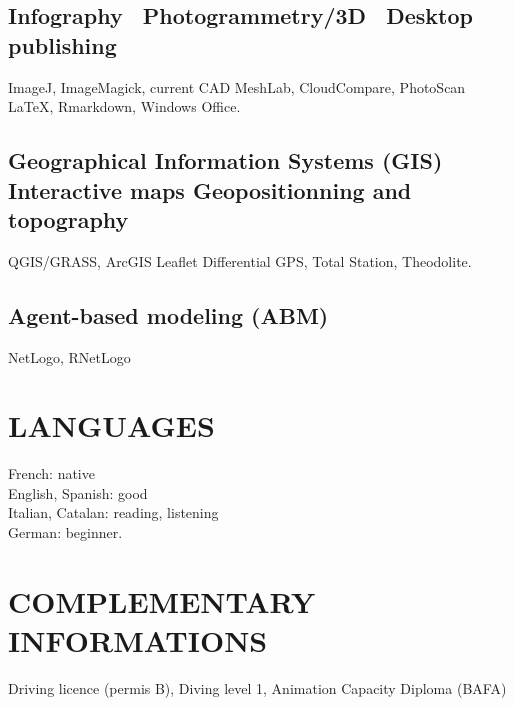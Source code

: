 \documentclass[11pt]{report} %
\begin{document}
\subsection*{Infography~{\textbar} Photogrammetry/3D~{\textbar} Desktop publishing}

ImageJ, ImageMagick, current CAD \textbf{{\textbar}} MeshLab, CloudCompare, PhotoScan \textbf{{\textbar}} \LaTeX, Rmarkdown, Windows Office.\textbf{}

\subsection*{Geographical Information Systems (GIS) {\textbar} Interactive maps {\textbar} Geopositionning and topography}

QGIS/GRASS, ArcGIS {\textbar} Leaflet {\textbar} Differential GPS, Total Station, Theodolite.

\subsection*{Agent-based modeling (ABM)}

NetLogo, RNetLogo

\section*{LANGUAGES}

French: native \\
English, Spanish: good \\
Italian, Catalan: reading, listening \\
German: beginner.

\section*{COMPLEMENTARY INFORMATIONS}

Driving licence (permis B), Diving level 1, Animation Capacity Diploma (BAFA)
\end{document}
